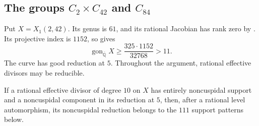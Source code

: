 \subsection{The groups $C_2\times C_{42}$ and $C_{84}$}
\label{subsec:decic242}

Put $X=X_1(2,42)$. Its genus is $61$, and its rational Jacobian
has rank zero by \cite[Theorem~3.1]{DEHMZ}.
Its projective index is $1152$, so
\cite[(2.1)]{NV} gives
\[
 \operatorname{gon}_{\overline{\mathbb Q}}X\geq
 \frac{325\cdot1152}{32768}>11.
\]
The curve has good reduction at $5$.
Throughout the argument, rational effective divisors may be reducible.



\begin{lemma}\label{lem:decic242-first-finite-sieves}
If a rational effective divisor of degree $10$ on $X$ has entirely
noncuspidal support and a noncuspidal component in its reduction
at $5$, then, after a rational level automorphism, its noncuspidal
reduction belongs to the $111$ support patterns below.
\end{lemma}
